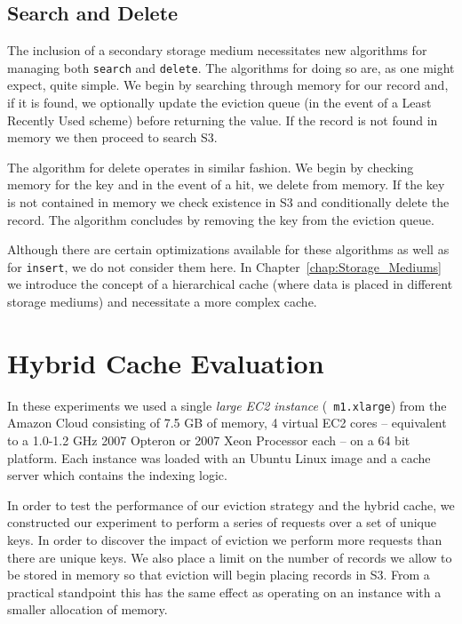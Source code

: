 
\subsection{Search and Delete} %
\label{sub:hybrid_search_delete}
The inclusion of a secondary storage medium necessitates new algorithms for
managing both {\tt search} and {\tt delete}. The algorithms for doing so are,
as one might expect, quite simple. We begin by searching through memory for our
record and, if it is found, we optionally update the eviction queue (\eg in the
event of a Least Recently Used scheme) before returning the value. If the
record is not found in memory we then proceed to search S3.

The algorithm for delete operates in similar fashion. We begin by checking
memory for the key and in the event of a hit, we delete from memory. If the key
is not contained in memory we check existence in S3 and conditionally delete
the record. The algorithm concludes by removing the key from the eviction
queue.

Although there are certain optimizations available for these algorithms as well
as for {\tt insert}, we do not consider them here. In
Chapter~\ref{chap:Storage_Mediums} we introduce the concept of a hierarchical
cache (where data is placed in different storage mediums) and necessitate a
more complex cache.



\section{Hybrid Cache Evaluation} %
\label{sub:hybrid_system_evaluation}
In these experiments we used a single \emph{large EC2 instance} ({\tt
m1.xlarge}) from the Amazon Cloud consisting of 7.5 GB of memory, 4 virtual EC2
cores -- equivalent to a 1.0-1.2 GHz 2007 Opteron or 2007 Xeon Processor each
-- on a 64 bit platform.  Each instance was loaded with an Ubuntu Linux image
and a cache server which contains the indexing logic.

In order to test the performance of our eviction strategy and the hybrid cache,
we constructed our experiment to perform a series of requests over a set of
unique keys. In order to discover the impact of eviction we perform more
requests than there are unique keys. We also place a limit on the number of
records we allow to be stored in memory so that eviction will begin placing
records in S3. From a practical standpoint this has the same effect as
operating on an instance with a smaller allocation of memory.

